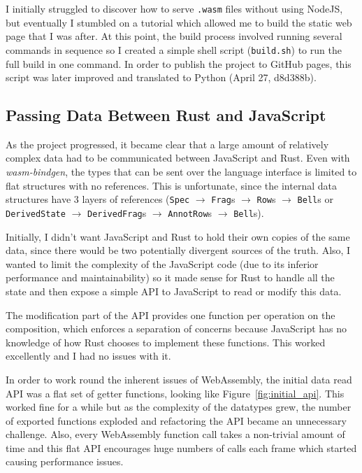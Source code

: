 \documentclass[12pt]{article}
\begin{document}
I initially struggled to discover how to serve \verb|.wasm| files
without using NodeJS, but eventually I stumbled on a tutorial which allowed me to build the static
web page that I was after.  At this point, the build process involved running several commands in
sequence so I created a simple shell script (\verb|build.sh|) to run the full build in one command.
In order to publish the project to GitHub pages, this script was later improved and translated to
Python (April 27, d8d388b).

\subsection{Passing Data Between Rust and JavaScript}

As the project progressed, it became clear that a large amount of relatively complex data had to be
communicated between JavaScript and Rust.  Even with \emph{wasm-bindgen}, the types that can be sent
over the language interface is limited to flat structures with no references.  This is unfortunate,
since the internal data structures have 3 layers of references (\verb|Spec| $\to$ \verb|Frag|s $\to$
\verb|Row|s $\to$ \verb|Bell|s or \verb|DerivedState| $\to$ \verb|DerivedFrag|s $\to$
\verb|AnnotRow|s $\to$ \verb|Bell|s).

Initially, I didn't want JavaScript and Rust to hold their own copies of the same data, since there
would be two potentially divergent sources of the truth.  Also, I wanted to limit the complexity of
the JavaScript code (due to its inferior performance and maintainability) so it made sense for Rust
to handle all the state and then expose a simple API to JavaScript to read or modify this data.

The modification part of the API provides one function per operation on the composition, which
enforces a separation of concerns because JavaScript has no knowledge of how Rust chooses to
implement these functions.  This worked excellently and I had no issues with it.

In order to work round the inherent issues of WebAssembly, the initial data read API was a flat set
of getter functions, looking like Figure~\ref{fig:initial_api}.  This worked fine for a while but as
the complexity of the datatypes grew, the number of exported functions exploded and refactoring the
API became an unnecessary challenge.  Also, every WebAssembly function call takes a non-trivial
amount of time and this flat API encourages huge numbers of calls each frame which started causing
performance issues.
\end{document}
